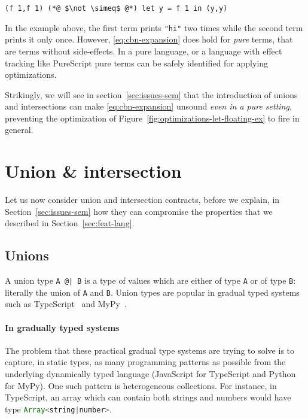 \documentclass[sigplan,10pt,review,anonymous]{acmart}
\newcommand{\resolved}[2]{}
\newcommand{\nickel}[1]{\lstinline[language=nickel]{#1}}
\newcommand{\typescript}[1]{\lstinline[language=JavaScript]{#1}}
\begin{document}
\begin{lstlisting}[language=Nickel]
(f 1,f 1) (*@ $\not \simeq$ @*) let y = f 1 in (y,y)
\end{lstlisting}

In the example above, the first term prints \nickel{"hi"} two times while the
second term prints it only once. However, \ref{eq:cbn-expansion} does hold for
\emph{pure} terms, that are terms without side-effects. In a pure language, or a
language with effect tracking like PureScript\resolved{Cite a different
    language, or remove citation. (ADDED) tbh PureScript is still
statically-typed, compiled lang, but who knows: the "script" in the name and the
web orientation may still be more appealing to the audience of DLS}, pure terms
can be safely identified for applying optimizations.

Strikingly, we will see in section~\ref{sec:issues-sem} that the introduction of
unions and intersections can make \ref{eq:cbn-expansion} unsound \emph{even in a
pure setting}, preventing the optimization of
Figure~\ref{fig:optimizations-let-floating-ex} to fire in general.

\section{Union \& intersection}
\label{sec:union-inter}

Let us now consider union and intersection contracts, before we
explain, in Section~\ref{sec:issues-sem} how they can compromise the
properties that we described in Section~\ref{sec:feat-lang}.

\subsection{Unions}

A union type \nickel{A @| B} is a type of values which are either of
type \nickel{A} or of type \nickel{B}: literally the union of
\nickel{A} and \nickel{B}. Union types are popular in gradual typed
systems such as TypeScript~\cite{TypeScriptUnions} and
MyPy~\cite{MyPyOptional}.

\paragraph{In gradually typed systems}

The problem that these practical gradual type systems are trying to solve is to
capture, in static types, as many programming patterns as possible
from the underlying dynamically typed language (JavaScript for
TypeScript and Python for MyPy). One such pattern is
heterogeneous collections. For instance, in TypeScript, an array
which can contain both strings and numbers would have type
\typescript{Array<string|number>}.
\end{document}
